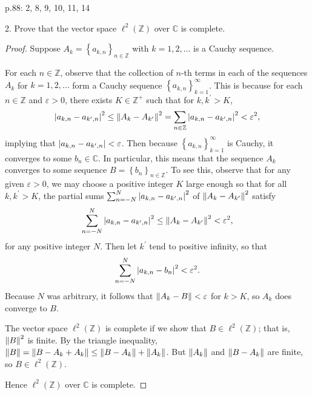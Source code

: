 \documentclass[11pt]{article}
\newcommand{\cbr}[1]{\left\{#1\right\}}
\begin{document}
p.88: 2, 8, 9, 10, 11, 14

2. Prove that the vector space $\ell^2(\mathbb{Z})$ over $\mathbb{C}$ is complete.
\begin{proof}
    Suppose $A_k = \cbr{a_{k,n}}_{n\in\mathbb{Z}}$ with $k = 1,2,\dots$ is a Cauchy sequence.

    For each $n\in\mathbb{Z}$, observe that the collection of $n$-th terms in each of the sequences $A_k$ for $k = 1,2,\dots$ form a Cauchy sequence $\cbr{a_{k,n}}_{k=1}^{\infty}$. This is because for each $n\in \mathbb{Z}$ and $\varepsilon > 0$, there exists $K\in \mathbb{Z}^{+}$ such that for $k,k^{\prime} > K$, 
    \[\abs{a_{k,n} - a_{k^{\prime},n}}^2 \leq \norm{A_k - A_{k^{\prime}}}^2 = \sum_{n\in\mathbb{Z}} \abs{a_{k,n} - a_{k^{\prime},n}}^2 < \varepsilon^2,\]
    implying that $\abs{a_{k,n} - a_{k^{\prime},n}} < \varepsilon$. Then because $\cbr{a_{k,n}}_{k=1}^{\infty}$ is Cauchy, it converges to some $b_n\in \mathbb{C}$. In particular, this means that the sequence $A_k$ converges to some sequence $B = \cbr{b_n}_{n\in\mathbb{Z}}$. To see this, observe that for any given $\varepsilon > 0$, we may choose a positive integer $K$ large enough so that for all $k,k^{\prime} > K$, the partial sums $\sum_{n=-N}^{N}\abs{a_{k,n} - a_{k^{\prime},n}}^2$ of $\norm{A_k - A_{k^{\prime}}}^2$ satisfy
    \[\sum_{n=-N}^{N}\abs{a_{k,n} - a_{k^{\prime},n}}^2 \leq \norm{A_k - A_{k^{\prime}}}^2 < \varepsilon^2,\] for any positive integer $N$. Then let $k^{\prime}$ tend to positive infinity, so that
    \[\sum_{n=-N}^{N}\abs{a_{k,n} - b_n}^2 < \varepsilon^2.\] Because $N$ was arbitrary, it follows that $\norm{A_k - B} < \varepsilon$ for $k > K$, so $A_k$ does converge to $B$.
    
    The vector space $\ell^2(\mathbb{Z})$ is complete if we show that $B\in\ell^2(\mathbb{Z})$; that is, $\norm{B}^2$ is finite. By the triangle inequality, $\norm{B} = \norm{B-A_k+A_k} \leq \norm{B-A_k} + \norm{A_k}$. But $\norm{A_k}$ and $\norm{B-A_k}$ are finite, so $B\in \ell^{2}(\mathbb{Z})$. 
    
    Hence $\ell^{2}(\mathbb{Z})$ over $\mathbb{C}$ is complete.
\end{proof}
\end{document}
